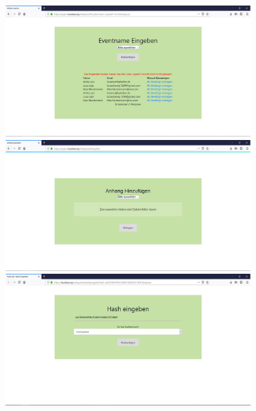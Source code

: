 \documentclass[12pt,twoside]{article}  %
\begin{document}
    \includegraphics[width=0.7\textwidth]{offen.jpg} \\
    \includegraphics[width=0.7\textwidth]{anhang.jpg} \\
    \includegraphics[width=0.7\textwidth]{bestaetigung.jpg} \\
\end{document}

